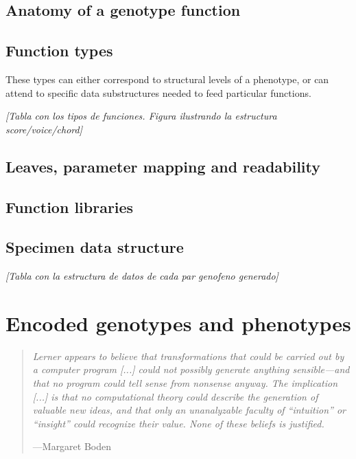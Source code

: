 \documentclass{article}
\begin{document}
\subsection{Anatomy of a genotype function}

\subsection{Function types}


These types can either correspond to structural levels of a phenotype, or can attend to specific data substructures needed to feed particular functions.

{\color{gray} \textsl{[Tabla con los tipos de funciones. Figura ilustrando la estructura score/voice/chord]}}

\subsection{Leaves, parameter mapping and readability}

\subsection{Function libraries}

\subsection{Specimen data structure}


{\color{gray} \textsl{[Tabla con la estructura de datos de cada par geno\/feno generado]}}



\section{Encoded genotypes and phenotypes}

\begin{samepage}
\begin{quotation}
\textsl{Lerner appears to believe that transformations that could be carried
out by a computer program [...] could not possibly generate anything sensible---and that no program could tell sense from nonsense anyway. The implication [...] is that no computational theory could describe the generation of valuable new ideas, and that only an unanalyzable faculty of ``intuition'' or ``insight'' could recognize their value. None of these beliefs is justified.}

---Margaret Boden \cite{BodenWhatIsCr}
\end{quotation}
\end{samepage}
\end{document}
